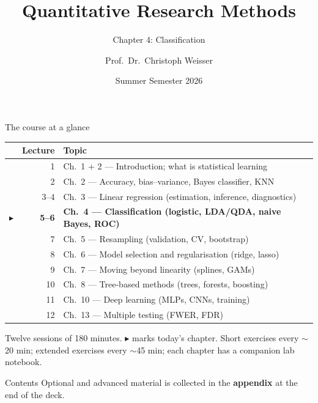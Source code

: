 \documentclass[aspectratio=169,11pt]{beamer}
\title{Quantitative Research Methods}
\subtitle{Chapter 4: Classification}
\author{Prof.\ Dr.\ Christoph Weisser}\institute{HSBI}
\date{Summer Semester 2026}\graphicspath{{images/}}
\begin{document}
\begin{frame}[plain]\titlepage\end{frame}

\begin{frame}{The course at a glance}
  \footnotesize
  \begin{center}
  \begin{tabular}{@{}c r l@{}}
    & \textbf{Lecture} & \textbf{Topic}\\
    \midrule
     & 1 & Ch.\ 1 + 2 --- Introduction; what is statistical learning \\
     & 2 & Ch.\ 2 --- Accuracy, bias--variance, Bayes classifier, KNN \\
     & 3--4 & Ch.\ 3 --- Linear regression (estimation, inference, diagnostics) \\
    $\blacktriangleright$ & \textbf{5--6} & \textbf{Ch.\ 4 --- Classification (logistic, LDA/QDA, naive Bayes, ROC)} \\
     & 7 & Ch.\ 5 --- Resampling (validation, CV, bootstrap) \\
     & 8 & Ch.\ 6 --- Model selection and regularisation (ridge, lasso) \\
     & 9 & Ch.\ 7 --- Moving beyond linearity (splines, GAMs) \\
     & 10 & Ch.\ 8 --- Tree-based methods (trees, forests, boosting) \\
     & 11 & Ch.\ 10 --- Deep learning (MLPs, CNNs, training) \\
     & 12 & Ch.\ 13 --- Multiple testing (FWER, FDR) \\
  \end{tabular}
  \end{center}
  \vspace{2pt}
  {\scriptsize Twelve sessions of 180 minutes. $\blacktriangleright$ marks today's chapter. Short exercises every $\sim$20 min; extended exercises every $\sim$45 min; each chapter has a companion lab notebook.}
\end{frame}


\begin{frame}{Contents}\small
  \tableofcontents[hideallsubsections]
  \vfill
  {\tiny Optional and advanced material is collected in the \textbf{appendix} at the end of the deck.}
\end{frame}
\end{document}
